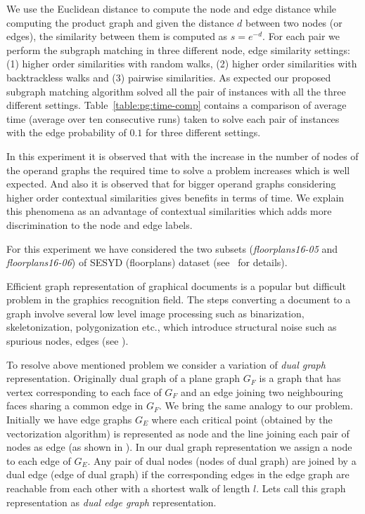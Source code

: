 We use the Euclidean distance to compute the node and edge distance while computing the product graph and given the distance $d$ between two nodes (or edges), the similarity between them is computed as $s=e^{-d}$. For each pair we perform the subgraph matching in three different node, edge similarity settings: (1) higher order similarities with random walks, (2) higher order similarities with backtrackless walks and (3) pairwise similarities. As expected our proposed subgraph matching algorithm solved all the pair of instances with all the three different settings. Table~\ref{table:pg:time-comp} contains a comparison of average time (average over ten consecutive runs) taken to solve each pair of instances with the edge probability of $0.1$ for three different settings.

In this experiment it is observed that with the increase in the number of nodes of the operand graphs the required time to solve a problem increases which is well expected. And also it is observed that for bigger operand graphs considering higher order contextual similarities gives benefits in terms of time. We explain this phenomena as an advantage of contextual similarities which adds more discrimination to the node and edge labels.

For this experiment we have considered the two subsets (\emph{floorplans16-05} and \emph{floorplans16-06}) of SESYD (floorplans) dataset (see~ for details).

Efficient graph representation of graphical documents is a popular but difficult problem in the graphics recognition field. The steps converting a document to a graph involve several low level image processing such as binarization, skeletonization, polygonization etc., which introduce structural noise such as spurious nodes, edges (see ).

To resolve above mentioned problem we consider a variation of \emph{dual graph} representation. Originally dual graph of a plane graph $G_F$ is a graph that has vertex corresponding to each face of $G_F$ and an edge joining two neighbouring faces sharing a common edge in $G_F$. We bring the same analogy to our problem. Initially we have edge graphs $G_E$ where each critical point (obtained by the vectorization algorithm) is represented as node and the line joining each pair of nodes as edge (as shown in ). In our dual graph representation we assign a node to each edge of $G_E$. Any pair of dual nodes (nodes of dual graph) are joined by a dual edge (edge of dual graph) if the corresponding edges in the edge graph are reachable from each other with a shortest walk of length $l$. Lets call this graph representation as \emph{dual edge graph} representation.

